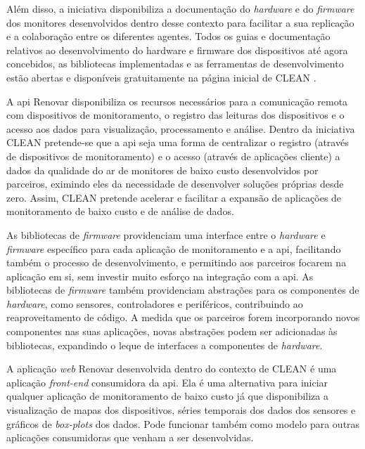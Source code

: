 Além disso, a iniciativa disponibiliza a documentação do \textit{hardware} e do \textit{firmware} dos monitores desenvolvidos dentro desse contexto para facilitar a sua replicação e a colaboração entre os diferentes agentes. Todos os guias e documentação relativos ao desenvolvimento do hardware e firmware dos dispositivos até agora concebidos, as bibliotecas implementadas e as ferramentas de desenvolvimento estão abertas e disponíveis gratuitamente na página inicial de CLEAN \cite{Campo2021}.

A \acrshort{api} Renovar disponibiliza os recursos necessários para a comunicação remota com dispositivos de monitoramento, o registro das leituras dos dispositivos e o acesso aos dados para visualização, processamento e análise. Dentro da iniciativa CLEAN pretende-se que a \acrshort{api} seja uma forma de centralizar o registro (através de dispositivos de monitoramento) e o acesso (através de aplicações cliente) a dados da qualidade do ar de monitores de baixo custo desenvolvidos por parceiros, eximindo eles da necessidade de desenvolver soluções próprias desde zero. Assim, CLEAN pretende acelerar e facilitar a expansão de aplicações de monitoramento de baixo custo e de análise de dados. 

As bibliotecas de \textit{firmware} providenciam uma interface entre o \textit{hardware} e \textit{firmware} específico para cada aplicação de monitoramento e a \acrshort{api}, facilitando também o processo de desenvolvimento, e permitindo aos parceiros focarem na aplicação em si, sem investir muito esforço na integração com a \acrshort{api}. As bibliotecas de \textit{firmware} também providenciam abstrações para os componentes de \textit{hardware}, como sensores, controladores e periféricos, contribuindo ao reaproveitamento de código. A medida que os parceiros forem incorporando novos componentes nas suas aplicações, novas abstrações podem ser adicionadas às bibliotecas, expandindo o leque de interfaces a componentes de \textit{hardware}.

A aplicação \textit{web} Renovar desenvolvida dentro do contexto de CLEAN é uma aplicação \textit{front-end} consumidora da \acrshort{api}. Ela é uma alternativa para iniciar qualquer aplicação de monitoramento de baixo custo já que disponibiliza a visualização de mapas dos dispositivos, séries temporais dos dados dos sensores e gráficos de \textit{box-plots} dos dados. Pode funcionar também como modelo para outras aplicações consumidoras que venham a ser desenvolvidas.



